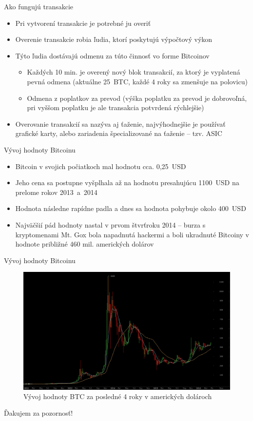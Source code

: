 \documentclass{beamer}
\begin{document}
\begin{frame}{Ako fungujú transakcie}
    \begin{itemize}
        \item Pri vytvorení transakcie je potrebné ju overiť
        \item Overenie transakcie robia ľudia, ktorí poskytujú výpočtový výkon
        \item Týto ľudia dostávajú odmenu za túto činnosť vo forme Bitcoinov
            \begin{itemize}
                \item Každých 10 min. je overený nový blok transakcií, za ktorý je vyplatená pevná odmena (aktuálne 25~BTC, každé 4 roky sa zmenšuje na polovicu)
                \item Odmena z poplatkov za prevod (výška poplatku za prevod je dobrovoľná, pri vyššom poplatku je ale transakcia potvrdená rýchlejšie)
            \end{itemize}
        \item Overovanie transakcií sa nazýva aj ťaženie, najvýhodnejšie je používať grafické karty, alebo zariadenia špecializované na ťaženie -- tzv. ASIC
    \end{itemize}
\end{frame}
\begin{frame}{Vývoj hodnoty Bitcoinu}
    \begin{itemize}
        \item Bitcoin v svojich počiatkoch mal hodnotu cca. 0,25~USD
        \item Jeho cena sa postupne vyšplhala až na hodnotu presahujúcu 1100~USD na prelome rokov 2013~a~2014
        \item Hodnota následne rapídne padla a dnes sa hodnota pohybuje okolo 400~USD
        \item Najväčšií pád hodnoty nastal v prvom štvrťroku 2014 -- burza s kryptomenami Mt. Gox bola napadnutá hackermi a boli ukradnuté Bitcoiny v hodnote približné 460 mil. amerických dolárov
    \end{itemize}
\end{frame}
\begin{frame}{Vývoj hodnoty Bitcoinu}
    \begin{figure}
    \includegraphics[scale=0.24]{btchodnota.png}
    \caption{Vývoj hodnoty BTC za posledné 4 roky v amerických dolároch}
    \end{figure}
\end{frame}


\begin{frame}[standout]
    Ďakujem za pozornosť! 
\end{frame}
\end{document}
